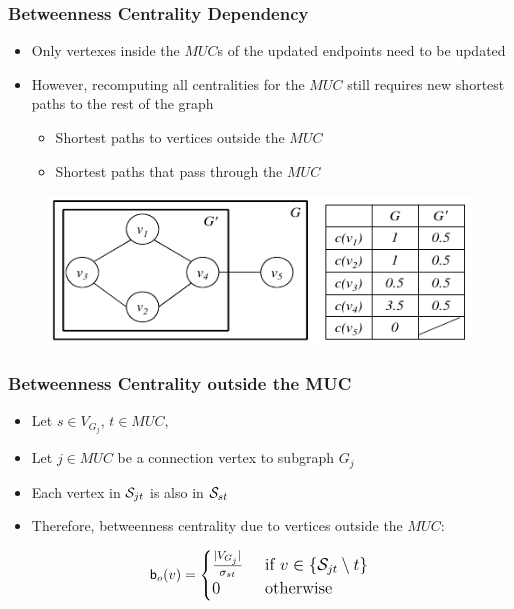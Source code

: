 \begin{frame}
  \frametitle{Betweenness Centrality Dependency}
  
  \begin{itemize}
    \item Only vertexes inside the $MUC$s of the updated endpoints need to be updated
    \item However, recomputing all centralities for the $MUC$ still requires new shortest paths to the rest of the graph
      \begin{itemize}
        \item Shortest paths to vertices outside the $MUC$
        \item Shortest paths that pass through the $MUC$
      \end{itemize}
  \end{itemize}
  
  \begin{figure}[t]
    \centering
    \includegraphics[width=\textwidth, height=0.6\textheight, keepaspectratio]{imgs/qube-btwmuc}
  \end{figure}
\end{frame}


\begin{frame}
  \frametitle{Betweenness Centrality outside the MUC}
  
  \begin{itemize}
    \item Let $s \in V_{G_j}$, $t \in MUC$,
    \item Let $j \in MUC$ be a connection vertex to subgraph $G_j$
    \item Each vertex in $\mathcal{S}_{jt}$ is also in $\mathcal{S}_{st}$
    \item Therefore, betweenness centrality due to vertices outside the $MUC$:    
  \end{itemize}
  
  \begin{align*}
    \large
    \mathsf{b}_{o}(v) = \begin{cases}
      \frac{|V_{G_j}|}{\sigma_{st}}		& \text{ if } v \in\{ \mathcal{S}_{jt} \setminus t \} \\
      0 						& \text{ otherwise }
    \end{cases}
  \end{align*}
\end{frame}


